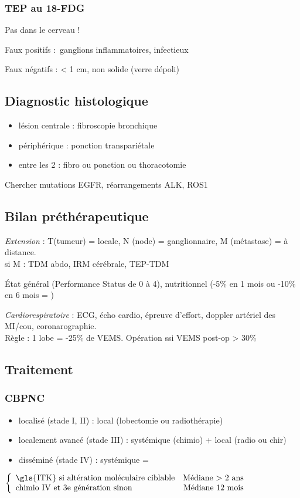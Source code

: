 \documentclass{book}
\begin{document}
\subsubsection{TEP au 18-FDG}
\label{sec:orgda110ad}
Pas dans le cerveau !

Faux positifs : ganglions inflammatoires, infectieux

Faux négatifs : < 1 cm, non solide (verre dépoli)

\subsection{Diagnostic histologique}
\label{sec:orgd2dd041}

\begin{itemize}
\item lésion centrale : fibroscopie bronchique
\item périphérique : ponction transpariétale
\item entre les 2 : fibro ou ponction ou thoracotomie
\end{itemize}

Chercher mutations EGFR, réarrangements ALK, ROS1

\subsection{Bilan préthérapeutique}
\label{sec:org918daa0}
\emph{Extension}  : T(tumeur) = locale, N (node) = ganglionnaire, M
(métastase) = à distance. \\
si M : TDM abdo, IRM cérébrale, TEP-TDM

État général (Performance Status de 0 à 4), nutritionnel (-5\% en 1 mois ou
-10\% en 6 mois = \frownie{})

\emph{Cardiorespiratoire} : ECG, écho cardio, épreuve d'effort, doppler artériel des MI/cou,
coronarographie.\\
Règle : 1 lobe = -25\% de VEMS. Opération ssi VEMS post-op > 30\%
\subsection{Traitement}
\label{sec:org14222c6}
\subsubsection{CBPNC}
\label{sec:org486c057}

\begin{itemize}
\item localisé (stade I, II) : local (lobectomie ou radiothérapie)
\item localement avancé (stade III) : systémique (chimio) + local (radio ou
chir)
\item disséminé (stade IV) : systémique =
\end{itemize}
$\left \{
  \begin{array}{lr}
    \text{\gls{ITK} si altération moléculaire ciblable} & \text{Médiane > 2 ans}\\
    \text{chimio IV et 3e génération sinon} & \text{Médiane 12 mois}\\
  \end{array}
\right.$
\end{document}
